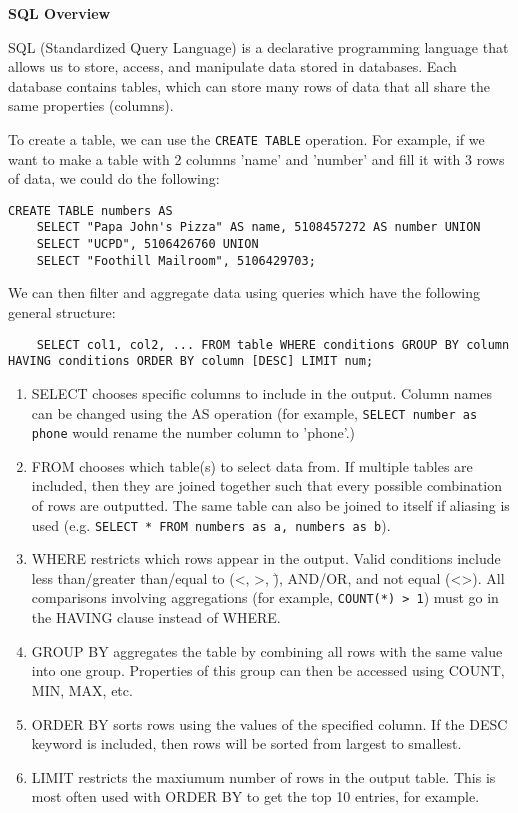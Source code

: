 \textbf{SQL Overview} 
\newline

SQL (Standardized Query Language) is a declarative programming language that allows us to store, access, and manipulate data stored in databases.
Each database contains tables, which can store many rows of data that all share the same properties (columns). 

To create a table, we can use the \texttt{CREATE TABLE} operation. For example, if we want to make a table with 2 columns 'name' and 'number' and fill it with 3 rows of data, we could do the following:
\newline

\begin{lstlisting}
CREATE TABLE numbers AS
    SELECT "Papa John's Pizza" AS name, 5108457272 AS number UNION
    SELECT "UCPD", 5106426760 UNION
    SELECT "Foothill Mailroom", 5106429703;
\end{lstlisting}
\newpage

We can then filter and aggregate data using queries which have the following general structure:
\begin{lstlisting}
    SELECT col1, col2, ... FROM table WHERE conditions GROUP BY column HAVING conditions ORDER BY column [DESC] LIMIT num;
\end{lstlisting}
\begin{enumerate}
    \item SELECT chooses specific columns to include in the output. Column names can be changed using the AS operation (for example, \texttt{SELECT number as phone} would rename the number column to 'phone'.)
    \item FROM chooses which table(s) to select data from. If multiple tables are included, then they are joined together such that every possible combination of rows are outputted. The same table can also be joined to itself if aliasing is used (e.g. \texttt{SELECT * FROM numbers as a, numbers as b}).
    \item WHERE restricts which rows appear in the output. Valid conditions include less than/greater than/equal to (\textless, \textgreater, \=), AND/OR, and not equal (\textless\textgreater). All comparisons involving aggregations (for example, \texttt{COUNT(*) > 1}) must go in the HAVING clause instead of WHERE.
    \item GROUP BY aggregates the table by combining all rows with the same value into one group. Properties of this group can then be accessed using COUNT, MIN, MAX, etc.
    \item ORDER BY sorts rows using the values of the specified column. If the DESC keyword is included, then rows will be sorted from largest to smallest.
    \item LIMIT restricts the maxiumum number of rows in the output table. This is most often used with ORDER BY to get the top 10 entries, for example.
\end{enumerate}
